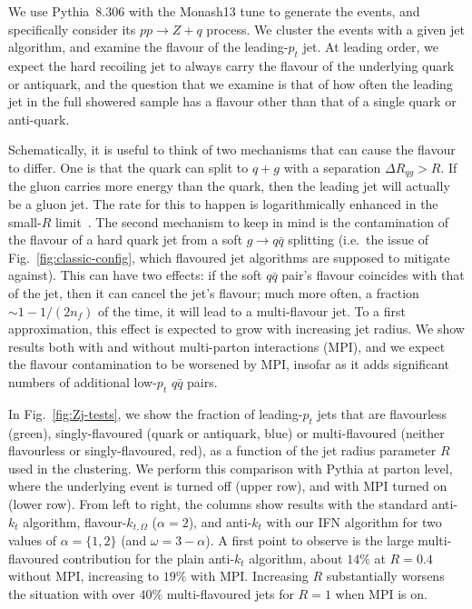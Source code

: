 \documentclass[nofootinbib,twocolumn,preprintnumbers,superscriptaddress,aps]{revtex4-2}
\begin{document}
We use Pythia~8.306 with the Monash13 tune to generate the events, and specifically consider
its $pp \to Z+q$ process.
%
We cluster the events with a given jet algorithm, and examine the
flavour of the leading-$p_t$ jet.
%
At leading order, we expect the hard recoiling jet to always carry the
flavour of the underlying quark or antiquark, and the question that we
examine is that of how often the leading jet in the full showered
sample has a flavour other than that of a single quark or anti-quark.


Schematically, it is useful to think of two mechanisms that can cause
the flavour to differ.
%
One is that the quark can split to $q+g$ with a separation $\Delta R_{qg} >
R$.
%
If the gluon carries more energy than the quark, then the leading jet
will actually be a gluon jet.
%
The rate for this to happen is logarithmically enhanced in the
small-$R$ limit~\cite{Dasgupta:2014yra}.
%
The second mechanism to keep in mind is the contamination of the
flavour of a hard quark jet from a soft $g \to q\bar q$
splitting (i.e.\ the issue of Fig.~\ref{fig:classic-config}, which
flavoured jet algorithms are supposed to mitigate against). 
%
This can have two effects: if the soft $q\bar q$ pair's flavour
coincides with that of the jet, then it can cancel the jet's flavour;
much more often, a fraction $\sim 1 - 1/(2n_f)$ of the time, it will
lead to a multi-flavour jet. 
%
To a first approximation, this effect is expected to grow with
increasing jet radius.
%
We show results both with and without multi-parton interactions (MPI),
and we expect the flavour contamination to be worsened by MPI, insofar
as it adds significant numbers of additional low-$p_t$ $q\bar q$
pairs.

In Fig.~\ref{fig:Zj-tests}, we show the fraction of leading-$p_t$ jets
that are flavourless (green), singly-flavoured (quark or antiquark,
blue) or multi-flavoured (neither flavourless or singly-flavoured,
red), as a function of the jet radius parameter $R$ used in the
clustering.
%
We perform this comparison with Pythia at parton level, where the underlying
event is turned off (upper row), and with MPI turned on (lower row).
%
From left to right, the columns show results with the standard
anti-$k_t$ algorithm, flavour-$k_{t,\Omega}$ ($\alpha=2$), and
anti-$k_t$ with our IFN algorithm for two values of $\alpha=\{1,2\}$
(and $\omega=3-\alpha$).
%
A first point to observe is the large multi-flavoured contribution for
the plain anti-$k_t$ algorithm, about $14\%$ at $R=0.4$ without MPI,
increasing to $19\%$ with MPI.
%
Increasing $R$ substantially worsens the situation with over $40\%$
multi-flavoured jets for $R=1$ when MPI is on.
\end{document}
